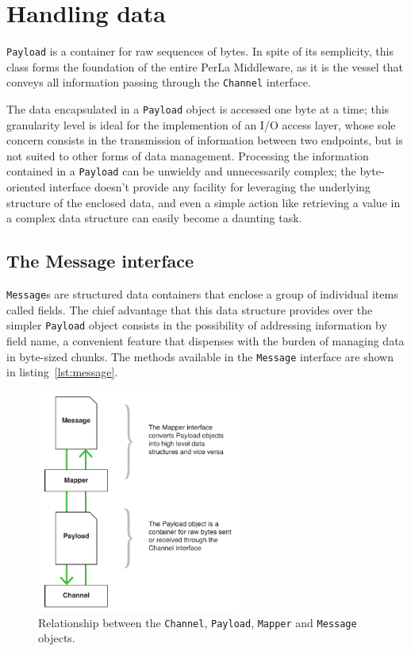 \section{Handling data}
\label{sec:components.mapper}

\texttt{Payload} is a container for raw sequences of bytes. In spite of its
semplicity, this class forms the foundation of the entire PerLa Middleware, as
it is the vessel that conveys all information passing through the
\texttt{Channel} interface.

The data encapsulated in a \texttt{Payload} object is accessed one byte at a
time; this granularity level is ideal for the implemention of an I/O access
layer, whose sole concern consists in the transmission of information between
two endpoints, but is not suited to other forms of data management. Processing
the information contained in a \texttt{Payload} can be unwieldy and
unnecessarily complex; the byte-oriented interface doesn't provide any facility
for leveraging the underlying structure of the enclosed data, and even a simple
action like retrieving a value in a complex data structure can easily become a
daunting task.


\subsection{The Message interface}

\texttt{Message}s are structured data containers that enclose a group of
individual items called fields. The chief advantage that this data structure
provides over the simpler \texttt{Payload} object consists in the possibility
of addressing information by field name, a convenient feature that dispenses
with the burden of managing data in byte-sized chunks. The methods available in
the \texttt{Message} interface are shown in listing~\ref{lst:message}.

\begin{figure}[!hbt]
\center
\includegraphics[width=0.6\textwidth]{imgs/mapper_payload.pdf}
\caption{Relationship between the \texttt{Channel}, \texttt{Payload},
\texttt{Mapper} and \texttt{Message} objects.}
\label{fig:channel.async}
\end{figure}

